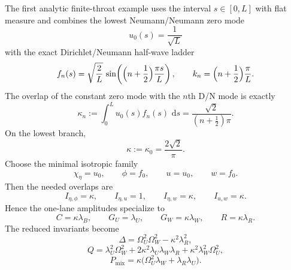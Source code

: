 \documentclass[11pt]{article}
\theoremstyle{definition}
\newcommand{\dd}{\,\mathrm{d}}
\begin{document}
The first analytic finite-throat example uses the interval $s\in[0,L]$ with flat measure and combines the lowest Neumann/Neumann zero mode
\begin{equation}
 u_0(s)=\frac{1}{\sqrt L}
 \label{eq:app-u0-mode}
\end{equation}
with the exact Dirichlet/Neumann half-wave ladder
\begin{equation}
 f_n(s)=\sqrt{\frac{2}{L}}\,
 \sin\!\left(\Bigl(n+\frac12\Bigr)\frac{\pi s}{L}\right),
 \qquad
 k_n=\Bigl(n+\frac12\Bigr)\frac{\pi}{L}.
 \label{eq:app-dn-half-wave}
\end{equation}
The overlap of the constant zero mode with the $n$th D/N mode is exactly
\begin{equation}
 \kappa_n
 :=
 \int_0^L u_0(s)f_n(s)\,\dd s
 =
 \frac{\sqrt2}{(n+\tfrac12)\pi}.
 \label{eq:app-kappa-n}
\end{equation}
On the lowest branch,
\begin{equation}
 \kappa:=\kappa_0=\frac{2\sqrt2}{\pi}.
 \label{eq:app-kappa0}
\end{equation}
Choose the minimal isotropic family
\begin{equation}
 \chi_\eta=u_0,
 \qquad
 \phi=f_0,
 \qquad
 u=u_0,
 \qquad
 w=f_0.
 \label{eq:app-minimal-finite-throat-family}
\end{equation}
Then the needed overlaps are
\begin{equation}
 I_{\eta,\phi}=\kappa,
 \qquad
 I_{\eta,u}=1,
 \qquad
 I_{\eta,w}=\kappa,
 \qquad
 I_{u,w}=\kappa.
 \label{eq:app-minimal-finite-throat-overlaps}
\end{equation}
Hence the one-lane amplitudes specialize to
\begin{equation}
 C=\kappa\lambda_B,
 \qquad
 G_U=\lambda_U,
 \qquad
 G_W=\kappa\lambda_W,
 \qquad
 R=\kappa\lambda_R.
 \label{eq:app-minimal-finite-throat-amplitudes}
\end{equation}
The reduced invariants become
\begin{equation}
 \Delta = \Omega_U^2\Omega_W^2-\kappa^2\lambda_R^2,
 \label{eq:app-minimal-finite-throat-delta}
\end{equation}
\begin{equation}
 Q = \lambda_U^2\Omega_W^2 + 2\kappa^2\lambda_U\lambda_W\lambda_R + \kappa^2\lambda_W^2\Omega_U^2,
 \label{eq:app-minimal-finite-throat-q}
\end{equation}
\begin{equation}
 P_{\mathrm{mix}} = \kappa\bigl(\Omega_U^2\lambda_W+\lambda_R\lambda_U\bigr).
 \label{eq:app-minimal-finite-throat-pmix}
\end{equation}
\end{document}
